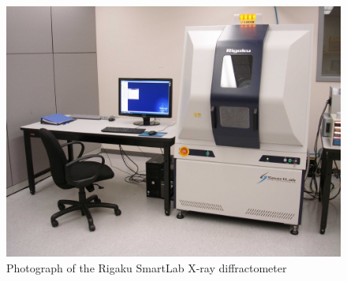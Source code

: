 
\begin{figure}[htbp]
   \centering
   \includegraphics[width=0.75\linewidth]{./figures/characterization/rigaku-smartlab-photo.jpg} 
   \caption[Rigaku SmartLab XRD]%
   		{Photograph of the Rigaku SmartLab X-ray diffractometer}
   \label{fig:rigaku-smartlab-photo}
\end{figure}



%


































	
	
	